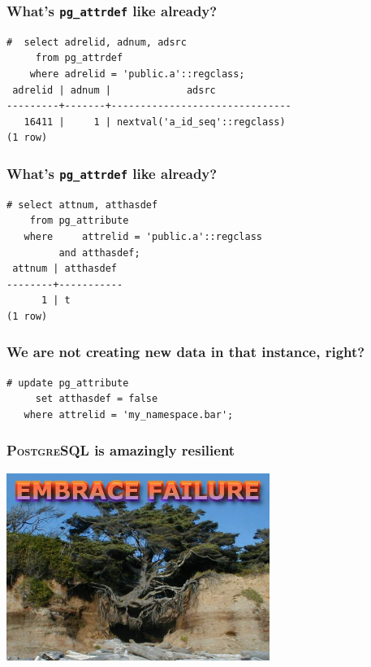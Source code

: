 \documentclass{beamer}
\begin{document}
\begin{frame}[fragile]
  \frametitle{What's \texttt{pg\_attrdef} like already?}

  \begin{verbatim}
#  select adrelid, adnum, adsrc
     from pg_attrdef
    where adrelid = 'public.a'::regclass;
 adrelid | adnum |             adsrc             
---------+-------+-------------------------------
   16411 |     1 | nextval('a_id_seq'::regclass)
(1 row)
  \end{verbatim}
\end{frame}

\begin{frame}[fragile]
  \frametitle{What's \texttt{pg\_attrdef} like already?}

  \begin{verbatim}
# select attnum, atthasdef
    from pg_attribute
   where     attrelid = 'public.a'::regclass
         and atthasdef;
 attnum | atthasdef 
--------+-----------
      1 | t
(1 row)
  \end{verbatim}
\end{frame}

\begin{frame}[fragile]
  \frametitle{We are not creating new data in that instance, right?}

  \begin{verbatim}
# update pg_attribute
     set atthasdef = false
   where attrelid = 'my_namespace.bar';
  \end{verbatim}
\end{frame}

\begin{frame}
  \frametitle{\textsc{PostgreSQL} is amazingly resilient}

  \begin{center}
    \includegraphics[height=2.4in]{resilience_logo.jpg}
  \end{center}
\end{frame}
\end{document}
